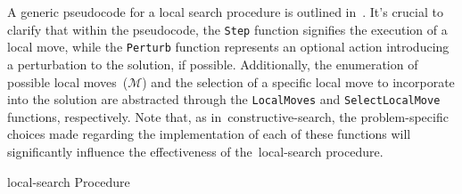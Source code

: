 A generic pseudocode for a local search procedure is outlined
in~. It's crucial to clarify that within the pseudocode, the
\texttt{Step} function signifies the execution of a local move, while the
\texttt{Perturb} function represents an optional action introducing a
perturbation to the solution, if possible. Additionally, the enumeration of
possible local moves~($\mathcal{M}$) and the selection of a specific local move to incorporate
into the solution are abstracted through the \texttt{LocalMoves} and
\texttt{SelectLocalMove} functions, respectively. Note that, as
in~\acrshort{constructive-search}, the problem-specific choices made regarding
the implementation of each of these functions will significantly influence the
effectiveness of the~\acrshort{local-search} procedure.

\begin{algorithm}
  
  \caption{\acrlong{local-search} Procedure}
  \label{algorithm:ls}
\end{algorithm}